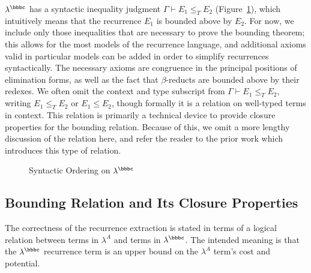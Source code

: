 $\lambda^\bbbc$ has a syntactic inequality judgment $\Gamma
\vdash E_1 \leq_T E_2$ (Figure~\ref{fig:syn-ord}), which intuitively means
that the recurrence $E_1$ is bounded above by $E_2$.  For now, we
include only those inequalities that are necessary to prove the
bounding theorem; this allows for the most models of the
recurrence language, and additional axioms valid in particular models
can be added in order to simplify recurrences syntactically.  The
necessary axioms are congruence in the principal positions of
elimination forms, as well as the fact that $\beta$-reducts are bounded
above by their redexes.  We often omit the context and type subscript
from $\Gamma \vdash E_1 \leq_T E_2$, writing $E_1 \leq_T E_2$ or $E_1
\leq E_2$, though formally it is a relation on well-typed terms in
context. This relation is primarily a technical device to provide closure
properties for the bounding relation. Because of this, we omit a more lengthy
discussion of the relation here, and refer the reader to the prior work
\cite{danner-et-al:icfp15} which introduces this type of relation.

\begin{figure}
  
  \vspace{-0.25in}
  \caption{Syntactic Ordering on $\lambda^\bbbc$}
  \label{fig:syn-ord}
\end{figure}

\subsection{Bounding Relation and Its Closure Properties}

The correctness of the recurrence extraction is stated in terms of a
logical relation between terms in $\lambda^A$ and terms in
$\lambda^\bbbc$. The intended meaning is that the $\lambda^\bbbc$
recurrence term is an upper bound on the $\lambda^A$ term's cost and
potential.

